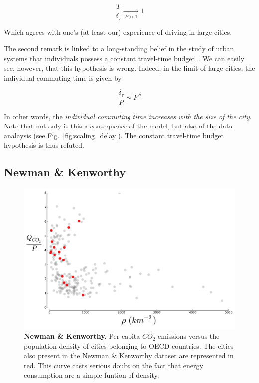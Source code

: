 \begin{equation}
    \displaystyle \frac{T}{\delta_\tau} \xrightarrow[\:P \gg 1\:]{} 1
\end{equation}

Which agrees with one's (at least our) experience of driving in large cities.

The second remark is linked to a long-standing belief in the study of urban
systems that individuals possess a constant travel-time
budget~\cite{Zahavi:1974}. We can easily see, however, that this hypothesis is
wrong. Indeed, in the limit of large cities, the individual commuting time is
given by

\begin{equation}
    \frac{\delta_\tau}{P} \sim P^{\,\delta}
\end{equation}

In other words, the \emph{individual commuting time increases with the size of the
city}. Note that not only is this a consequence of the model, but also of the
data analaysis (see Fig.~\ref{fig:scaling_delay}). The constant travel-time budget hypothesis is thus refuted.

\subsection{Newman \& Kenworthy}

\begin{figure}
    \centering
    \includegraphics[width=\textwidth]{gfx/chapter-scaling/newman_kenworthy.pdf}
    \caption{{\bf Newman \& Kenworthy.} Per capita $CO_2$ emissions versus the population density of cities
    belonging to OECD countries. The cities also present in the Newman \&
    Kenworthy dataset are represented in red. This curve casts serious doubt on
the fact that energy consumption are a simple funtion of
density.\label{fig:newman_kenworthy}}
\end{figure}


